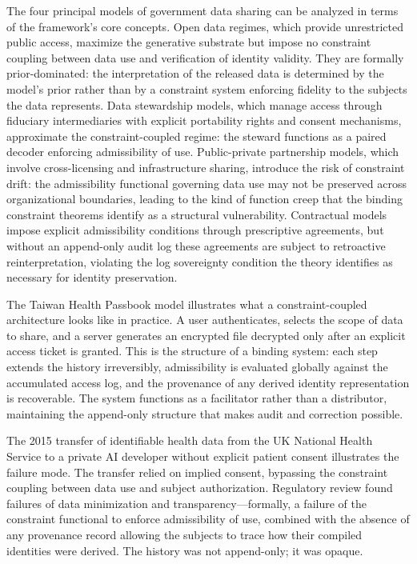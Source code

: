 \documentclass[12pt, a4paper]{article}
\theoremstyle{plain}
\theoremstyle{definition}
\theoremstyle{remark}
\begin{document}
The four principal models of government data sharing can be analyzed in terms of the framework's core concepts. Open data regimes, which provide unrestricted public access, maximize the generative substrate but impose no constraint coupling between data use and verification of identity validity. They are formally prior-dominated: the interpretation of the released data is determined by the model's prior rather than by a constraint system enforcing fidelity to the subjects the data represents. Data stewardship models, which manage access through fiduciary intermediaries with explicit portability rights and consent mechanisms, approximate the constraint-coupled regime: the steward functions as a paired decoder enforcing admissibility of use. Public-private partnership models, which involve cross-licensing and infrastructure sharing, introduce the risk of constraint drift: the admissibility functional governing data use may not be preserved across organizational boundaries, leading to the kind of function creep that the binding constraint theorems identify as a structural vulnerability. Contractual models impose explicit admissibility conditions through prescriptive agreements, but without an append-only audit log these agreements are subject to retroactive reinterpretation, violating the log sovereignty condition the theory identifies as necessary for identity preservation.

The Taiwan Health Passbook model illustrates what a constraint-coupled architecture looks like in practice. A user authenticates, selects the scope of data to share, and a server generates an encrypted file decrypted only after an explicit access ticket is granted. This is the structure of a binding system: each step extends the history irreversibly, admissibility is evaluated globally against the accumulated access log, and the provenance of any derived identity representation is recoverable. The system functions as a facilitator rather than a distributor, maintaining the append-only structure that makes audit and correction possible.

The 2015 transfer of identifiable health data from the UK National Health Service to a private AI developer without explicit patient consent illustrates the failure mode. The transfer relied on implied consent, bypassing the constraint coupling between data use and subject authorization. Regulatory review found failures of data minimization and transparency---formally, a failure of the constraint functional to enforce admissibility of use, combined with the absence of any provenance record allowing the subjects to trace how their compiled identities were derived. The history was not append-only; it was opaque.
\end{document}
